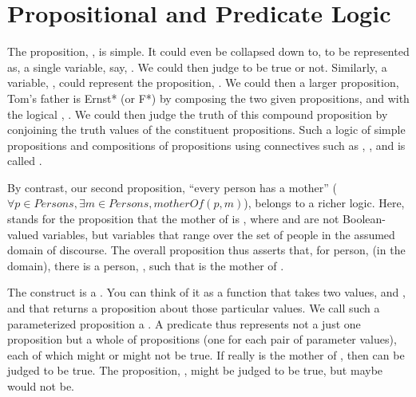 \documentclass[letterpaper,10pt,english]{sphinxmanual}
\begin{document}
\section{Propositional and Predicate Logic}
\label{\detokenize{09-propositional-logic:propositional-and-predicate-logic}}
The proposition, , is simple. It could even be
collapsed down to, to be represented as, a single variable, say, .
We could then judge  to be true or not. Similarly, a variable, ,
could represent the proposition, .  We could
then  a larger proposition, 
Tom’s father is Ernst* (or  F*) by composing the two given
propositions,  and  with the logical , . We
could then judge the truth of this compound proposition by conjoining
the truth values of the constituent propositions.  Such a logic of
simple propositions and compositions of propositions using connectives
such as , , and  is called .

By contrast, our second proposition, “every person has a mother”
(\(\forall p \in Persons, \exists m \in Persons, motherOf(p,m)\)),
belongs to a richer logic.  Here,  stands for the
proposition that the mother of  is , where  and  are not
Boolean-valued variables, but variables that range over the set of
people in the assumed domain of discourse.  The overall proposition
thus asserts that, for  person,  (in the domain), there is a
person, , such that  is the mother of .

The  construct is a . You
can think of it as a function that takes two values,  and , and
that returns a proposition about those particular values. We call such
a parameterized proposition a . A predicate thus represents
not a just one proposition but a whole  of propositions (one
for each pair of parameter values), each of which might or might not
be true. If  really is the mother of , then  can
be judged to be true. The proposition, , might be
judged to be true, but  maybe would not be.
\end{document}
